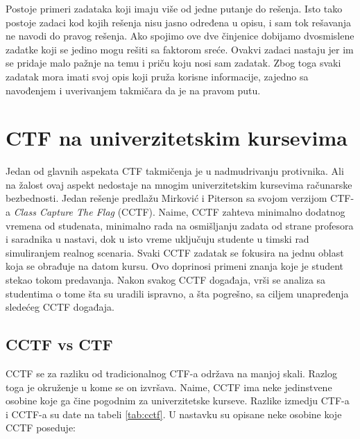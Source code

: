 \documentclass[12pt, a4paper, twocolumn]{article}
\begin{document}
Postoje primeri zadataka koji imaju više od jedne putanje do rešenja. Isto
tako postoje zadaci kod kojih rešenja nisu jasno određena u opisu, i
sam tok rešavanja ne navodi do pravog rešenja. Ako spojimo ove dve činjenice
dobijamo dvosmislene zadatke koji se jedino mogu rešiti sa faktorom sreće.
Ovakvi zadaci nastaju jer im se pridaje malo pažnje na temu i priču koju 
nosi sam zadatak. Zbog toga svaki zadatak mora imati svoj opis koji pruža
korisne informacije, zajedno sa navođenjem i uverivanjem takmičara da je na 
pravom putu.

\section{CTF na univerzitetskim kursevima}

Jedan od glavnih aspekata CTF takmičenja je u nadmudrivanju protivnika. Ali na
žalost ovaj aspekt nedostaje na mnogim univerzitetskim kursevima računarske
bezbednosti. Jedan rešenje predlažu Mirković i Piterson \cite{ctf_class} sa
svojom verzijom CTF-a \emph{Class Capture The Flag} (CCTF). Naime, CCTF
zahteva minimalno dodatnog vremena od studenata, minimalno rada na 
osmišljanju zadata od strane profesora i saradnika u nastavi, dok u isto
vreme uključuju studente u timski rad simuliranjem realnog scenaria.
Svaki CCTF zadatak se fokusira na jednu oblast koja se obrađuje na datom 
kursu. Ovo doprinosi primeni znanja koje je student stekao tokom predavanja.
Nakon svakog CCTF događaja, vrši se analiza sa studentima o tome šta su
uradili ispravno, a šta pogrešno, sa ciljem unapređenja sledećeg CCTF 
događaja. 

\subsection{CCTF vs CTF}

CCTF se za razliku od tradicionalnog CTF-a održava na manjoj skali. Razlog 
toga je okruženje u kome se on izvršava. Naime, CCTF ima neke jedinstvene
osobine koje ga čine pogodnim za univerzitetske kurseve. Razlike izmedju
CTF-a i CCTF-a su date na tabeli \ref{tab:cctf}. U nastavku su opisane neke 
osobine koje CCTF poseduje:
\end{document}
